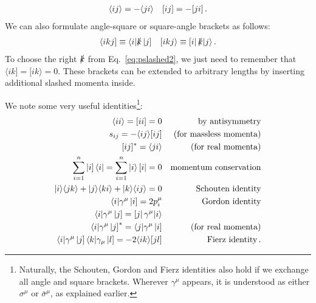 \documentclass[main.tex]{subfiles}
\begin{document}
\begin{align}
    \langle ij \rangle = -\langle ji \rangle && [ ij ] = -[ ji ]\,.
\end{align}
We can also formulate angle-square or square-angle brackets as follows:
\begin{align}
    \langle ikj ] \equiv \langle i| \slashed{k} \left| j \right] && [ikj\rangle \equiv \left[ i \right| \slashed{k} |j \rangle\,.
\end{align}
To choose the right $\slashed{k}$ from Eq.~\ref{eq:pslashed2}, we just need to remember that $\langle ik] = [ik\rangle = 0$. These brackets can be extended to arbitrary lengths by inserting additional slashed momenta inside. 

We note some very useful identities\footnote{Naturally, the Schouten, Gordon and Fierz identities also hold if we exchange all angle and square brackets. Wherever $\gamma^\mu$ appears, it is understood as either $\sigma^\mu$ or $\bar{\sigma}^\mu$, as explained earlier.}:
\begin{subequations} \label{eq:spinorsids}
    \begin{align}
        \braket{ii} = \braketsq{ii} = 0 && \text{by antisymmetry} \label{eq:iieq0} \\
        s_{ij} = -\braket{ij}\braketsq{ij} && \text{(for massless momenta)} \\
        \braketsq{ij}^{\ast} = \braket{ji} && \text{(for real momenta)} \label{eq:complexconjbracket} \\
        \sum_{i=1}^n \ketsq{i}\bra{i} = \sum_{i=1}^n \ket{i}\brasq{i} = 0 && \text{momentum conservation} \label{eq:spinmomcons}\\
        \ket{i}\braket{jk} + \ket{j}\braket{ki} + \ket{k}\braket{ij} = 0 && \text{Schouten identity} \label{eq:schouten} \\
        \bra{i}\gamma^\mu \ketsq{i} = 2p_i^\mu && \text{Gordon identity} \label{eq:gordon} \\
        \bra{i} \gamma^\mu \ketsq{j} = \brasq{j}\gamma^\mu \ket{i} && \\
        \bra{i}\gamma^\mu \ketsq{j}^{\ast} = \bra{j}\gamma^\mu \ketsq{i} && \text{(for real momenta)} \\
        \bra{i}\gamma^\mu \ketsq{j} \bra{k}\gamma_\mu \ketsq{l} = -2\braket{ik}\braketsq{jl} && \text{Fierz identity} \label{eq:fierz} \,.
    \end{align}

\end{subequations}
\end{document}
